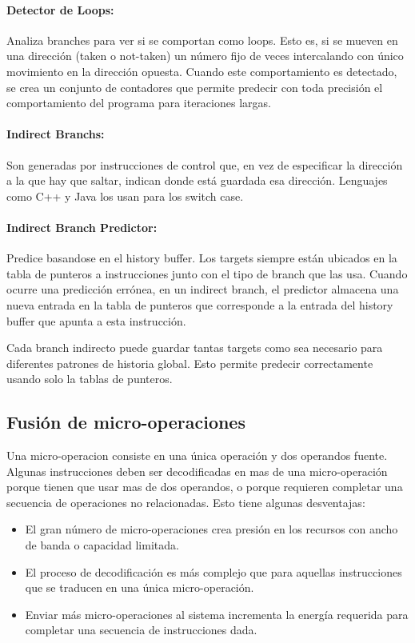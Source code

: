\paragraph{Detector de Loops:} Analiza branches para ver si se comportan como loops. Esto es, si se mueven en una dirección (taken o not-taken) un número fijo de veces intercalando con único movimiento en la dirección opuesta. Cuando este comportamiento es detectado, se crea un conjunto de contadores que permite predecir con toda precisión el comportamiento del programa para iteraciones largas.

\paragraph{Indirect Branchs:} Son generadas por instrucciones de control que, en vez de especificar la dirección a la que hay que saltar, indican donde está guardada esa dirección. Lenguajes como C++ y Java los usan para los switch case.

\paragraph{Indirect Branch Predictor:} Predice basandose en el history buffer. Los targets siempre están ubicados en la tabla de punteros a instrucciones junto con el tipo de branch que las usa. Cuando ocurre una predicción errónea, en un indirect branch, el predictor almacena una nueva entrada en la tabla de punteros que corresponde a la entrada del history buffer que apunta a esta instrucción.

Cada branch indirecto puede guardar tantas targets como sea necesario para diferentes patrones de historia global. Esto permite predecir correctamente usando solo la tablas de punteros.

\subsection{Fusión de micro-operaciones}
Una micro-operacion consiste en una única operación y dos operandos fuente. Algunas instrucciones deben ser decodificadas en mas de una micro-operación porque tienen que usar mas de dos operandos, o porque requieren completar una secuencia de operaciones no relacionadas. Esto tiene algunas desventajas:
\begin{itemize}
	\item El gran número de micro-operaciones crea presión en los recursos con  ancho de banda o capacidad limitada.
	
	\item El proceso de decodificación es más complejo que para aquellas instrucciones que se traducen en una única micro-operación.
	
	\item Enviar más micro-operaciones al sistema incrementa la energía requerida para completar una secuencia de instrucciones dada.
\end{itemize}

